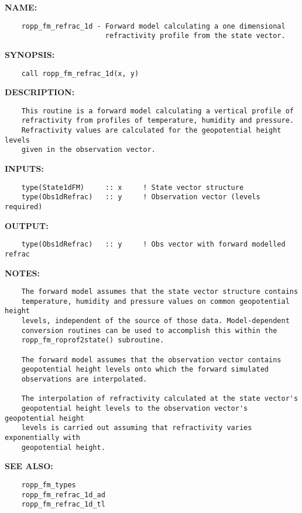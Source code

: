 \label{ch:robo76}
\label{ch:Refractivity_ropp_fm_refrac_1d}
\textbf{NAME:}\hspace{0.08in}\begin{Verbatim}
    ropp_fm_refrac_1d - Forward model calculating a one dimensional 
                        refractivity profile from the state vector.
\end{Verbatim}
\textbf{SYNOPSIS:}\hspace{0.08in}\begin{Verbatim}
    call ropp_fm_refrac_1d(x, y)
\end{Verbatim}
\textbf{DESCRIPTION:}\hspace{0.08in}\begin{Verbatim}
    This routine is a forward model calculating a vertical profile of 
    refractivity from profiles of temperature, humidity and pressure. 
    Refractivity values are calculated for the geopotential height levels 
    given in the observation vector.
\end{Verbatim}
\textbf{INPUTS:}\hspace{0.08in}\begin{Verbatim}
    type(State1dFM)     :: x     ! State vector structure
    type(Obs1dRefrac)   :: y     ! Observation vector (levels required)
\end{Verbatim}
\textbf{OUTPUT:}\hspace{0.08in}\begin{Verbatim}
    type(Obs1dRefrac)   :: y     ! Obs vector with forward modelled refrac
\end{Verbatim}
\textbf{NOTES:}\hspace{0.08in}\begin{Verbatim}
    The forward model assumes that the state vector structure contains 
    temperature, humidity and pressure values on common geopotential height 
    levels, independent of the source of those data. Model-dependent 
    conversion routines can be used to accomplish this within the 
    ropp_fm_roprof2state() subroutine.
 
    The forward model assumes that the observation vector contains 
    geopotential height levels onto which the forward simulated
    observations are interpolated.

    The interpolation of refractivity calculated at the state vector's
    geopotential height levels to the observation vector's geopotential height
    levels is carried out assuming that refractivity varies exponentially with
    geopotential height.
\end{Verbatim}
\textbf{SEE ALSO:}\hspace{0.08in}\begin{Verbatim}
    ropp_fm_types
    ropp_fm_refrac_1d_ad
    ropp_fm_refrac_1d_tl
\end{Verbatim}
